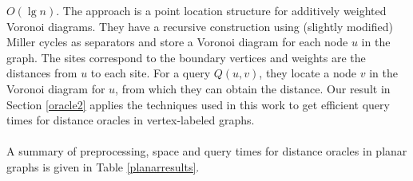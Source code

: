 $O(\lg n)$. The approach is a point location structure for additively weighted Voronoi
diagrams. They have a recursive construction using (slightly modified) Miller cycles as
separators and store a
Voronoi diagram for each node $u$ in the graph. The sites correspond to the boundary
vertices and weights are the distances from $u$ to each site. For a query $Q(u,v)$, they
locate a node $v$ in the Voronoi diagram for $u$, from which they can obtain the
distance. Our result in Section \ref{oracle2} applies the techniques used in this work to
get efficient query times for distance oracles in vertex-labeled graphs. \\
\\
A summary of preprocessing, space and query times for distance oracles in planar graphs is given in Table \ref{planarresults}.

